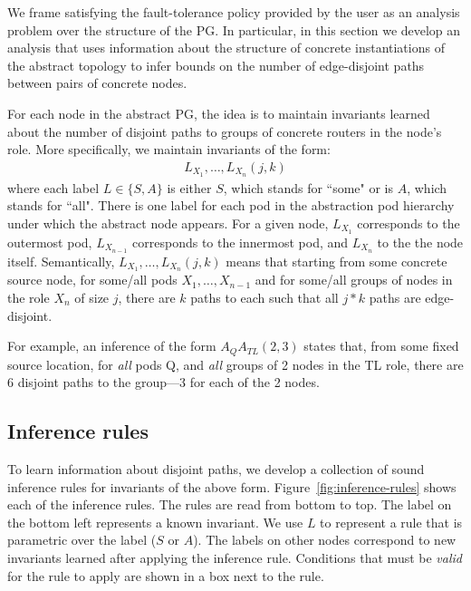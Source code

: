\documentclass[numbers, 10pt, preprint]{sigplanconf}
\begin{document}
%
We frame satisfying the fault-tolerance policy provided by the user as an analysis problem over the structure of the PG. In particular, in this section we develop an analysis that uses information about the structure of  concrete instantiations of the abstract topology to infer bounds on the number of edge-disjoint paths between pairs of concrete nodes. 

%
For each node in the abstract PG,
the idea is to maintain invariants learned about the number of disjoint paths
to groups of concrete routers in the node's role.
More specifically, we maintain invariants of the form:
%
\[ \begin{array}{c}
  L_{X_1}, \ldots, L_{X_n}(j,k)
\end{array} \]
\noindent
%
where each label $L \in \{S,A\}$ is either $S$, which stands for ``some" or is $A$, which stands for ``all". There is one label for each pod in the abstraction pod hierarchy under which the abstract node appears. For a given node, $L_{X_1}$ corresponds to the outermost pod, $L_{X_{n-1}}$ corresponds to the innermost pod, and $L_{X_n}$ to the the node itself.
Semantically, $L_{X_1}, \ldots, L_{X_n}(j,k)$ means that starting from some concrete source node, for some/all pods $X_1, \ldots, X_{n-1}$
and for some/all groups of nodes in the role $X_n$ of size $j$,
there are $k$ paths to each such that all $j*k$ paths are edge-disjoint.

For example,
an inference of the form $A_{Q} A_{TL}(2,3)$ states that, from some fixed source location, for \emph{all} pods Q, and \emph{all} groups of 2 nodes in the TL role, there are 6 disjoint paths to the group---3 for each of the 2 nodes.

\subsection{Inference rules}

\newcommand{\infrule}[1]{{\small \sf #1}\xspace}

To learn information about disjoint paths, we develop a collection of sound inference rules for invariants of the above form. Figure~\ref{fig:inference-rules} shows each of the inference rules. The rules are read from bottom to top. The label on the bottom left represents a known invariant. We use $L$ to represent a rule that is parametric over the label ($S$ or $A$). The labels on other nodes correspond to new invariants learned after applying the inference rule. Conditions that must be \emph{valid} for the rule to apply are shown in a box next to the rule.
\end{document}
